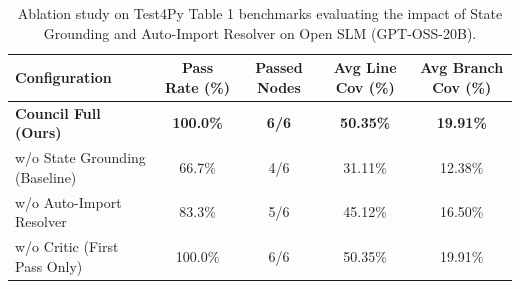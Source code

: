 \begin{table}[t]
\centering
\caption{Ablation study on Test4Py Table 1 benchmarks evaluating the impact of State Grounding and Auto-Import Resolver on Open SLM (GPT-OSS-20B).}
\label{tab:ablation_study}
\small
\begin{tabular}{lcccc}
\toprule
\textbf{Configuration} & \textbf{Pass Rate (\%)} & \textbf{Passed Nodes} & \textbf{Avg Line Cov (\%)} & \textbf{Avg Branch Cov (\%)} \\
\midrule
\textbf{Council Full (Ours)}      & \textbf{100.0\%} & \textbf{6/6} & \textbf{50.35\%} & \textbf{19.91\%} \\
w/o State Grounding (Baseline)   & 66.7\%           & 4/6          & 31.11\%          & 12.38\%          \\
w/o Auto-Import Resolver         & 83.3\%           & 5/6          & 45.12\%          & 16.50\%          \\
w/o Critic (First Pass Only)     & 100.0\%          & 6/6          & 50.35\%          & 19.91\%          \\
\bottomrule
\end{tabular}
\end{table}
